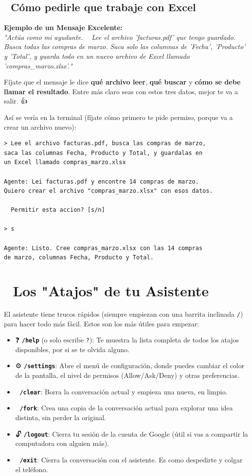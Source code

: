 \documentclass[12pt]{article}
\begin{document}
\subsection{📝 Cómo pedirle que trabaje con Excel}
\textbf{Ejemplo de un Mensaje Excelente:}\\
\textit{"Actúa como mi ayudante. 🙋‍♂️ Lee el archivo 'facturas.pdf' que tengo guardado. Busca todas las compras de marzo. Saca solo las columnas de 'Fecha', 'Producto' y 'Total', y guarda todo en un nuevo archivo de Excel llamado 'compras\_marzo.xlsx'."} 📂

Fíjate que el mensaje le dice \textbf{qué archivo leer}, \textbf{qué buscar} y \textbf{cómo se debe llamar el resultado}. Entre más claro seas con estos tres datos, mejor te va a salir. 👍

Así se vería en la terminal (fíjate cómo primero te pide permiso, porque va a crear un archivo nuevo):
\begin{verbatim}
> Lee el archivo facturas.pdf, busca las compras de marzo,
saca las columnas Fecha, Producto y Total, y guardalas en
un Excel llamado compras_marzo.xlsx

Agente: Lei facturas.pdf y encontre 14 compras de marzo.
Quiero crear el archivo "compras_marzo.xlsx" con esos datos.

  Permitir esta accion? [s/n]

> s

Agente: Listo. Cree compras_marzo.xlsx con las 14 compras
de marzo, columnas Fecha, Producto y Total.
\end{verbatim}

\newpage
\section{🚀 Los "Atajos" de tu Asistente}
El asistente tiene trucos rápidos (siempre empiezan con una barrita inclinada \texttt{/}) para hacer todo más fácil. Estos son los más útiles para empezar:
\begin{itemize}
    \item ❓ \textbf{\texttt{/help}} (o solo escribe \texttt{?}): Te muestra la lista completa de todos los atajos disponibles, por si se te olvida alguno.
    \item ⚙️ \textbf{\texttt{/settings}}: Abre el menú de configuración, donde puedes cambiar el color de la pantalla, el nivel de permisos (Allow/Ask/Deny) y otras preferencias.
    \item 🧹 \textbf{\texttt{/clear}}: Borra la conversación actual y empieza una nueva, en limpio.
    \item 🍴 \textbf{\texttt{/fork}}: Crea una copia de la conversación actual para explorar una idea distinta, sin perder la original.
    \item 🔓 \textbf{\texttt{/logout}}: Cierra tu sesión de la cuenta de Google (útil si vas a compartir la computadora con alguien más).
    \item 🚪 \textbf{\texttt{/exit}}: Cierra la conversación con el asistente. Es como despedirte y colgar el teléfono. 👋
\end{itemize}
\end{document}
